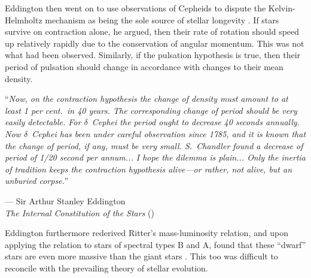 Eddington then went on to use observations of Cepheids to dispute the Kelvin-Helmholtz mechanism as being the sole source of stellar longevity \citep{1920SciMo..11..297E}. 
If stars survive on contraction alone, he argued, then their rate of rotation should speed up relatively rapidly due to the conservation of angular momentum. 
This was not what had been observed. 
Similarly, if the pulsation hypothesis is true, then their period of pulsation should change in accordance with changes to their mean density. 
\epigraph{``\emph{Now, on the contraction hypothesis the change of density must amount to at least \hphantom{``}1 per cent.\ in 40 years. The corresponding change of period should be very easily \hphantom{``}detectable. For $\delta$~Cephei the period ought to decrease 40 seconds annually. Now \hphantom{``}$\delta$~Cephei has been under careful observation since 1785, and it is known that \hphantom{``}the change of period, if any, must be very small. S.~Chandler found a decrease of \hphantom{``}period of 1/20 second per annum... I hope the dilemma is plain... Only the inertia \hphantom{``}of tradition keeps the contraction hypothesis alive---or rather, not alive, but an \hphantom{``}unburied corpse.}''}{--- Sir Arthur Stanley Eddington \\\emph{The Internal Constitution of the Stars} (\citeyear{1920SciMo..11..297E})} 

Eddington furthermore rederived Ritter's mass-luminosity relation, and upon applying the relation to stars of spectral types B and A, found that these ``dwarf'' stars are even more massive than the giant stars \citep[e.g.,][]{1924MNRAS..84..308E}. 
This too was difficult to reconcile with the prevailing theory of stellar evolution. 

